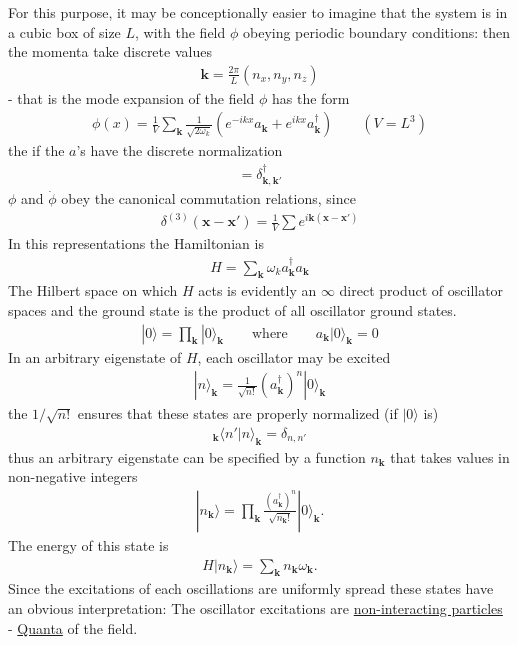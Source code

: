 \documentclass{article}
\begin{document}
For this purpose, it may be conceptionally easier to imagine that the system is in a cubic box of size $L$, with the field $\phi$ obeying periodic boundary conditions: then the momenta take discrete  values
\begin{align}
\mathbf{k}=\frac{2\pi}{L}(n_x,n_y,n_z)
\end{align}
 - that is the mode expansion of the field $\phi$ has the form
\begin{align}
\phi(x)=\frac{1}{V}\sum_{\mathbf{k}}\frac{1}{\sqrt{2\omega_k}}\left(e^{-ikx}a_\mathbf{k}+e^{ikx}a_\mathbf{k}^\dagger\right)\qquad(V=L^3)
\end{align}
the if the $a$'s have the discrete normalization 
\begin{align}
[a_\mathbf{k},a_{\mathbf{k}'}^\dagger]=\delta_\mathbf{k,\mathbf{k}'}^\dagger
\end{align}
$\phi$ and $\dot{\phi}$ obey the canonical commutation relations, since
\begin{align}
\delta^{(3)}(\mathbf{x-x'})=\frac{1}{V}\sum e^{i\mathbf{k}(\mathbf{x-x'})}
\end{align}
In this representations the Hamiltonian is
\begin{align}
H=\sum_{\mathbf{k}}\omega_ka_\mathbf{k}^\dagger a_\mathbf{k}
\end{align}
The Hilbert space on which $H$ acts is evidently an $\infty$ direct product of oscillator spaces and the ground state is the product of all oscillator ground states.
\begin{align}
|0\rangle=\prod_{\mathbf{k}}|0\rangle_\mathbf{k}\qquad\text{where}\qquad a_\mathbf{k}|0\rangle_\mathbf{k}=0
\end{align}
In an arbitrary eigenstate of $H$, each oscillator may be excited
\begin{align}
|n\rangle_\mathbf{k}=\frac{1}{\sqrt{n!}}(a_\mathbf{k}^\dagger)^n|0\rangle_\mathbf{k}
\end{align}
the $1/\sqrt{n!}$ ensures that these states are properly normalized (if $|0\rangle$ is)
\begin{align}
{}_\mathbf{k}\langle n'|n\rangle_\mathbf{k}=\delta_{n,n'}
\end{align}
thus an arbitrary eigenstate can be specified by a function $n_\mathbf{k}$ that takes values in non-negative integers
\begin{align}
|n_\mathbf{k}\rangle=\prod_\mathbf{k}\frac{(a_\mathbf{k}^\dagger)^n}{\sqrt{n_\mathbf{k}!}}|0\rangle_\mathbf{k}.
\end{align}
The energy of this state is
\begin{align}
H|n_\mathbf{k}\rangle=\sum_\mathbf{k}n_\mathbf{k}\omega_\mathbf{k}.
\end{align}
Since the excitations of each oscillations are uniformly spread these states have an obvious interpretation: The oscillator excitations are \underline{non-interacting particles} - \underline{Quanta} of the field. 
\end{document}
